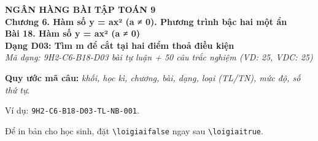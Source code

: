\documentclass[12pt,a4paper]{article}
\newif\ifloigiai
\begin{document}
\begin{center}
{\Large\textbf{NGÂN HÀNG BÀI TẬP TOÁN 9}}\\[3pt]
\textbf{Chương 6. Hàm số y = ax² (a ≠ 0). Phương trình bậc hai một ẩn}\\[2pt]
\textbf{Bài 18. Hàm số y = ax² (a ≠ 0)}\\[2pt]
\textbf{Dạng D03: Tìm m để cắt tại hai điểm thoả điều kiện}\\[2pt]
\textit{Mã dạng: 9H2-C6-B18-D03  bài tự luận + 50 câu trắc nghiệm \quad (VD: 25, VDC: 25)}
\end{center}
\textbf{Quy ước mã câu:} \textit{khối, học kì, chương, bài, dạng, loại (TL/TN), mức độ, số thứ tự}.\par Ví dụ: \texttt{9H2-C6-B18-D03-TL-NB-001}.\par Để in bản cho học sinh, đặt \verb|\loigiaifalse| ngay sau \verb|\loigiaitrue|.
\end{document}
